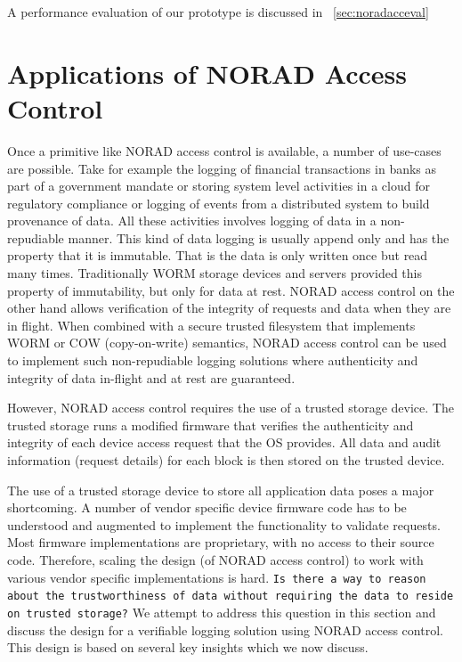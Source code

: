 \documentclass[withindex,glossary]{cam-thesis}
\begin{document}
A performance evaluation of our prototype is discussed in ~\ref{sec:noradacceval}

\section{Applications of NORAD Access Control}

Once a primitive like NORAD access control is available, a number of use-cases are possible.
Take for example the logging of financial transactions in banks as part of a government mandate or storing system level activities in a cloud for regulatory compliance or logging of events from a distributed system to build provenance of data.
All these activities involves logging of data in a non-repudiable manner.
This kind of data logging is usually append only and has the property that it is immutable.
That is the data is only written once but read many times.
Traditionally WORM storage devices and servers provided this property of immutability, but only for data at rest.
NORAD access control on the other hand allows verification of the integrity of requests and data when they are in flight.
When combined with a secure trusted filesystem that implements WORM or COW (copy-on-write) semantics, NORAD access control can be used to implement such non-repudiable logging solutions where authenticity and integrity of data in-flight and at rest are guaranteed.

However, NORAD access control requires the use of a trusted storage device.
The trusted storage runs a modified firmware that verifies the authenticity and integrity of each device access request that the OS provides.
All data and audit information (request details) for each block is then stored on the trusted device.

The use of a trusted storage device to store all application data poses a major shortcoming.
A number of vendor specific device firmware code has to be understood and augmented to implement the functionality to validate requests.
Most firmware implementations are proprietary, with no access to their source code.
Therefore, scaling the design (of NORAD access control) to work with various vendor specific implementations is hard.
\texttt{Is there a way to reason about the trustworthiness of data without requiring the data to reside on trusted storage?}
We attempt to address this question in this section and discuss the design for a verifiable logging solution using NORAD access control.
This design is based on several key insights which we now discuss.
\end{document}
